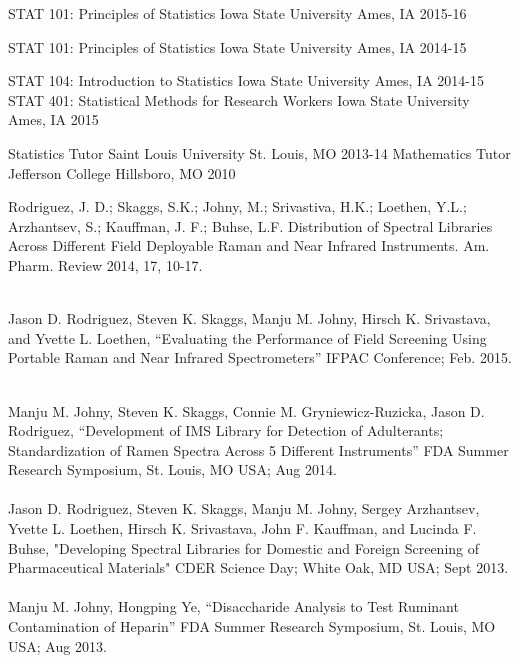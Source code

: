 \documentclass[11pt, a4paper]{awesome-cv}
\begin{document}
\vspace*{-2\baselineskip}
\begin{cvhonors}
  \cvhonor
    {STAT 101: Principles of Statistics}
    {Iowa State University}
    {Ames, IA}
    {2015-16}
 \end{cvhonors}
\begin{cvhonors}
  \cvhonor
    {STAT 101: Principles of Statistics}
    {Iowa State University}
    {Ames, IA}
    {2014-15}
 \end{cvhonors}
\begin{cvhonors}
  \cvhonor
    {STAT 104: Introduction to Statistics}
    {Iowa State University}
    {Ames, IA}
    {2014-15}
  \cvhonor
    {STAT 401: Statistical Methods for Research Workers}
    {Iowa State University}
    {Ames, IA}
    {2015}
 \end{cvhonors}
  \begin{cvhonors}
  \cvhonor
    {Statistics Tutor}
    {Saint Louis University}
    {St. Louis, MO}
    {2013-14}
  \cvhonor
    {Mathematics Tutor}
    {Jefferson College}
    {Hillsboro, MO}
    {2010}
 \end{cvhonors}
 
\small{Rodriguez, J. D.; Skaggs, S.K.; Johny, M.; Srivastiva, H.K.; Loethen, Y.L.; Arzhantsev, S.; Kauffman, J. F.; Buhse, L.F.  Distribution of Spectral Libraries Across Different Field Deployable Raman and Near Infrared Instruments. Am. Pharm. Review 2014, 17, 10-17.}
 
\\
\small{
Jason D. Rodriguez, Steven K. Skaggs, Manju M. Johny, Hirsch K. Srivastava, and Yvette L. Loethen, “Evaluating the Performance of Field Screening Using Portable Raman and Near Infrared Spectrometers” IFPAC Conference; Feb. 2015.
}

\\
\small{
Manju M. Johny, Steven K. Skaggs, Connie M. Gryniewicz-Ruzicka, Jason D. Rodriguez, “Development of IMS Library for Detection of Adulterants; Standardization of Ramen Spectra Across 5 Different Instruments” FDA Summer Research Symposium, St. Louis, MO USA; Aug 2014.
\\\\ 
Jason D. Rodriguez, Steven K. Skaggs, Manju M. Johny, Sergey Arzhantsev, Yvette L. Loethen, Hirsch K. Srivastava, John F. Kauffman, and Lucinda F. Buhse, "Developing Spectral Libraries for Domestic and Foreign Screening of Pharmaceutical Materials" CDER Science Day; White Oak, MD USA; Sept 2013.
\\\\
Manju M. Johny, Hongping Ye, “Disaccharide Analysis to Test Ruminant Contamination of Heparin” FDA Summer Research Symposium, St. Louis, MO USA; Aug 2013.
}
\end{document}
